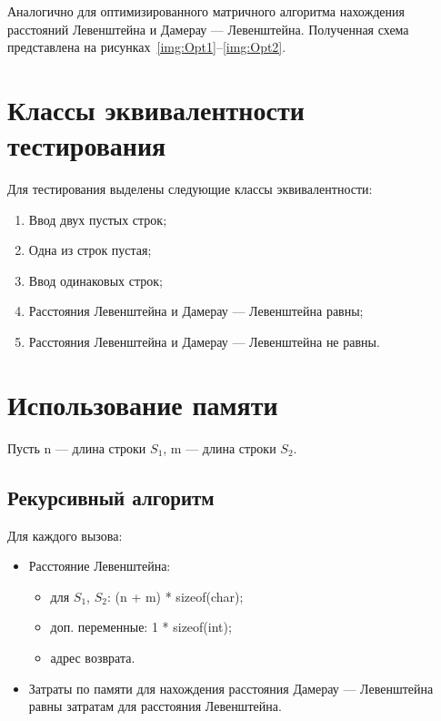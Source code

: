 
Аналогично для оптимизированного матричного алгоритма нахождения расстояний Левенштейна и Дамерау --- Левенштейна. Полученная схема представлена на рисунках~\ref{img:Opt1}--\ref{img:Opt2}.



\section{Классы эквивалентности тестирования}

Для тестирования выделены следующие классы эквивалентности:
\begin{enumerate}
	\item Ввод двух пустых строк;
	\item Одна из строк пустая;
	\item Ввод одинаковых строк;
	\item Расстояния Левенштейна и Дамерау --- Левенштейна равны;
	\item Расстояния Левенштейна и Дамерау --- Левенштейна не равны.
\end{enumerate}

\section{Использование памяти}

Пусть n --- длина строки $S_1$, m --- длина строки $S_2$.

\subsection{Рекурсивный алгоритм}

Для каждого вызова:
\begin{itemize}[label={---}]
	\item Расстояние Левенштейна:
	\begin{itemize}
		\item для $S_1$, $S_2$: (n + m) * sizeof(char);
		\item доп. переменные: 1 * sizeof(int);
		\item адрес возврата.
	\end{itemize}
	
	\item Затраты по памяти для нахождения расстояния Дамерау --- Левенштейна равны затратам для расстояния Левенштейна.
\end{itemize}

